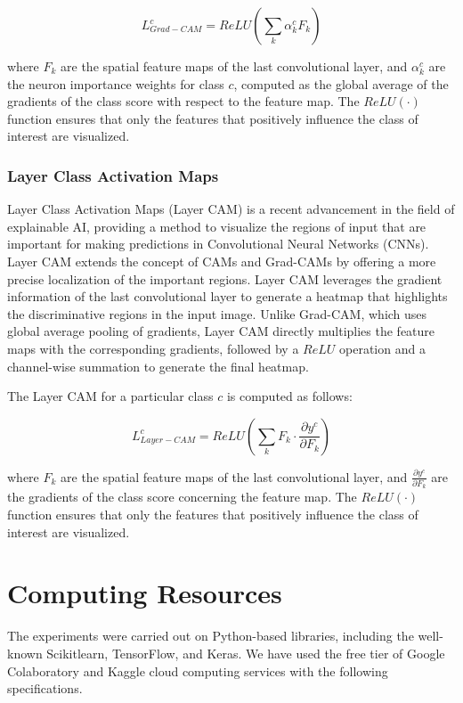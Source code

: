 \begin{equation}
    L_{Grad-CAM}^c = ReLU\left(\sum_k \alpha_k^c F_k\right)
\end{equation}

where $F_k$ are the spatial feature maps of the last convolutional layer, and $\alpha_k^c$ are the neuron importance weights for class $c$, computed as the global average of the gradients of the class score with respect to the feature map. The $ReLU(\cdot)$ function ensures that only the features that positively influence the class of interest are visualized.

\subsubsection{Layer Class Activation Maps}

Layer Class Activation Maps (Layer CAM) is a recent advancement in the field of explainable AI, providing a method to visualize the regions of input that are important for making predictions in Convolutional Neural Networks (CNNs). Layer CAM extends the concept of CAMs and Grad-CAMs by offering a more precise localization of the important regions. Layer CAM leverages the gradient information of the last convolutional layer to generate a heatmap that highlights the discriminative regions in the input image. Unlike Grad-CAM, which uses global average pooling of gradients, Layer CAM directly multiplies the feature maps with the corresponding gradients, followed by a $ReLU$ operation and a channel-wise summation to generate the final heatmap.

The Layer CAM for a particular class $c$ is computed as follows:

\begin{equation}
    L_{Layer-CAM}^c = ReLU\left(\sum_k F_k \cdot \frac{\partial y^c}{\partial F_k}\right)
\end{equation}

where $F_k$ are the spatial feature maps of the last convolutional layer, and $\frac{\partial y^c}{\partial F_k}$ are the gradients of the class score concerning the feature map. The $ReLU(\cdot)$ function ensures that only the features that positively influence the class of interest are visualized.

\section{Computing Resources}
The experiments were carried out on Python-based libraries, including the well-known Scikitlearn, TensorFlow, and Keras. We have used the free tier of Google Colaboratory and Kaggle cloud computing services with the following specifications. 


